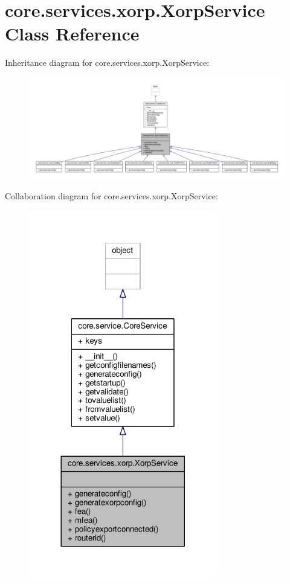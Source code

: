 \hypertarget{classcore_1_1services_1_1xorp_1_1_xorp_service}{\section{core.\+services.\+xorp.\+Xorp\+Service Class Reference}
\label{classcore_1_1services_1_1xorp_1_1_xorp_service}
}


Inheritance diagram for core.\+services.\+xorp.\+Xorp\+Service\+:
\nopagebreak
\begin{figure}[H]
\begin{center}
\leavevmode
\includegraphics[width=350pt]{classcore_1_1services_1_1xorp_1_1_xorp_service__inherit__graph}
\end{center}
\end{figure}


Collaboration diagram for core.\+services.\+xorp.\+Xorp\+Service\+:
\nopagebreak
\begin{figure}[H]
\begin{center}
\leavevmode
\includegraphics[width=233pt]{classcore_1_1services_1_1xorp_1_1_xorp_service__coll__graph}
\end{center}
\end{figure}
